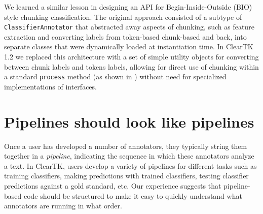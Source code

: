 \documentclass[10pt, a4paper]{article}
\newcommand{\code}[1]{\texttt{\small #1}}
\begin{document}
We learned a similar lesson in designing an API for Begin-Inside-Outside (BIO) style chunking classification.
The original approach consisted of a subtype of \code{ClassifierAnnotator} that abstracted away aspects of chunking, such as feature extraction and converting labels from token-based chunk-based and back, into separate classes that were dynamically loaded at instantiation time.
In ClearTK 1.2 we replaced this architecture with a set of simple utility objects for converting between chunk labels and tokens labels, allowing for direct use of chunking within a standard \code{process} method (as shown in ) without need for specialized implementations of interfaces.


\section{Pipelines should look like pipelines}
Once a user has developed a number of annotators, they typically string them together in a \emph{pipeline}, indicating the sequence in which these annotators analyze a text.
In ClearTK, users develop a variety of pipelines for different tasks such as training classifiers, making predictions with trained classifiers, testing classifier predictions against a gold standard, etc.  Our experience suggests that pipeline-based code should be structured to make it easy to quickly understand what annotators are running in what order.
\end{document}
